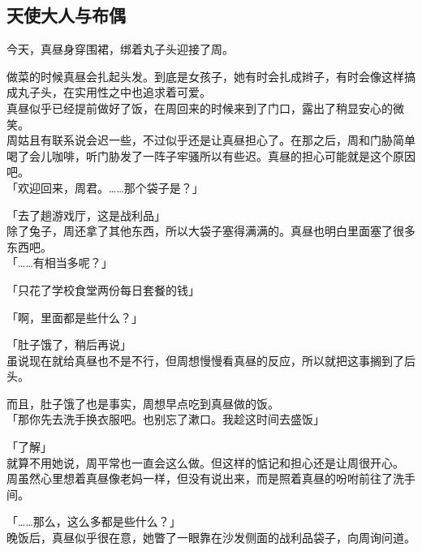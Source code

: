 \subsection{天使大人与布偶}

今天，真昼身穿围裙，绑着丸子头迎接了周。

做菜的时候真昼会扎起头发。到底是女孩子，她有时会扎成辫子，有时会像这样搞成丸子头，在实用性之中也追求着可爱。\\

真昼似乎已经提前做好了饭，在周回来的时候来到了门口，露出了稍显安心的微笑。\\

周姑且有联系说会迟一些，不过似乎还是让真昼担心了。在那之后，周和门胁简单喝了会儿咖啡，听门胁发了一阵子牢骚所以有些迟。真昼的担心可能就是这个原因吧。\\

「欢迎回来，周君。……那个袋子是？」

「去了趟游戏厅，这是战利品」\\

除了兔子，周还拿了其他东西，所以大袋子塞得满满的。真昼也明白里面塞了很多东西吧。\\

「……有相当多呢？」

「只花了学校食堂两份每日套餐的钱」

「啊，里面都是些什么？」

「肚子饿了，稍后再说」\\

虽说现在就给真昼也不是不行，但周想慢慢看真昼的反应，所以就把这事搁到了后头。

而且，肚子饿了也是事实，周想早点吃到真昼做的饭。\\

「那你先去洗手换衣服吧。也别忘了漱口。我趁这时间去盛饭」

「了解」\\

就算不用她说，周平常也一直会这么做。但这样的惦记和担心还是让周很开心。\\

周虽然心里想着真昼像老妈一样，但没有说出来，而是照着真昼的吩咐前往了洗手间。\\

\vspace{2\baselineskip}

「……那么，这么多都是些什么？」\\

晚饭后，真昼似乎很在意，她瞥了一眼靠在沙发侧面的战利品袋子，向周询问道。\\

